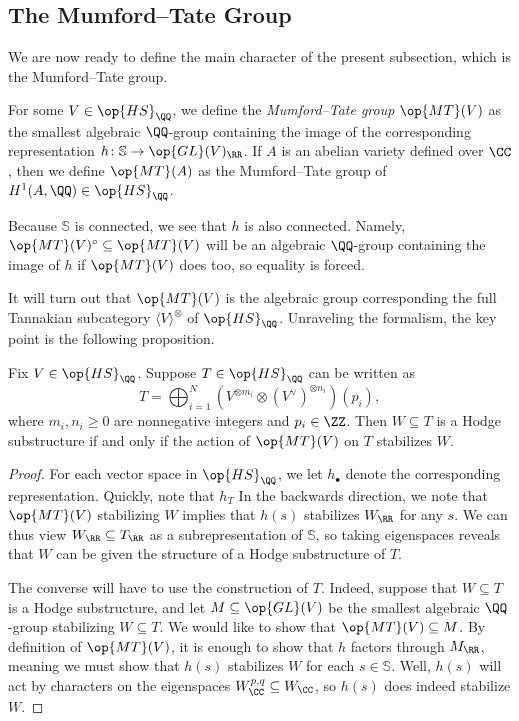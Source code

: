 \documentclass{article}
\begin{document}

\subsection{The Mumford--Tate Group}
We are now ready to define the main character of the present subsection, which is the Mumford--Tate group.\todo{}
\begin{definition}
	For some $V\in\op{HS}_\QQ$, we define the \textit{Mumford--Tate group} $\op{MT}(V)$ as the smallest algebraic $\QQ$-group containing the image of the corresponding representation $h\colon\mathbb S\to\op{GL}(V)_\RR$. If $A$ is an abelian variety defined over $\CC$, then we define $\op{MT}(A)$ as the Mumford--Tate group of $H^1(A,\QQ)\in\op{HS}_{\QQ}$.
\end{definition}
\begin{remark}
	Because $\mathbb S$ is connected, we see that $h$ is also connected. Namely, $\op{MT}(V)^\circ\subseteq\op{MT}(V)$ will be an algebraic $\QQ$-group containing the image of $h$ if $\op{MT}(V)$ does too, so equality is forced.
\end{remark}
It will turn out that $\op{MT}(V)$ is the algebraic group corresponding the full Tannakian subcategory $\langle V\rangle^{\otimes}$ of $\op{HS}_\QQ$. Unraveling the formalism, the key point is the following proposition.
\begin{proposition}
	Fix $V\in\op{HS}_\QQ$. Suppose $T\in\op{HS}_\QQ$ can be written as
	\[T=\bigoplus_{i=1}^N\left(V^{\otimes m_i}\otimes (V^\lor)^{\otimes n_i}\right)(p_i),\]
	where $m_i,n_i\ge0$ are nonnegative integers and $p_i\in\ZZ$. Then $W\subseteq T$ is a Hodge substructure if and only if the action of $\op{MT}(V)$ on $T$ stabilizes $W$.
\end{proposition}
\begin{proof}
	For each vector space in $\op{HS}_\QQ$, we let $h_\bullet$ denote the corresponding representation. Quickly, note that $h_T$ In the backwards direction, we note that $\op{MT}(V)$ stabilizing $W$ implies that $h(s)$ stabilizes $W_\RR$ for any $s$. We can thus view $W_\RR\subseteq T_\RR$ as a subrepresentation of $\mathbb S$, so taking eigenspaces reveals that $W$ can be given the structure of a Hodge substructure of $T$.

	The converse will have to use the construction of $T$. Indeed, suppose that $W\subseteq T$ is a Hodge substructure, and let $M\subseteq\op{GL}(V)$ be the smallest algebraic $\QQ$-group stabilizing $W\subseteq T$. We would like to show that $\op{MT}(V)\subseteq M$. By definition of $\op{MT}(V)$, it is enough to show that $h$ factors through $M_\RR$, meaning we must show that $h(s)$ stabilizes $W$ for each $s\in\mathbb S$. Well, $h(s)$ will act by characters on the eigenspaces $W^{p,q}_\CC\subseteq W_\CC$, so $h(s)$ does indeed stabilize $W$.
\end{proof}
\end{document}
